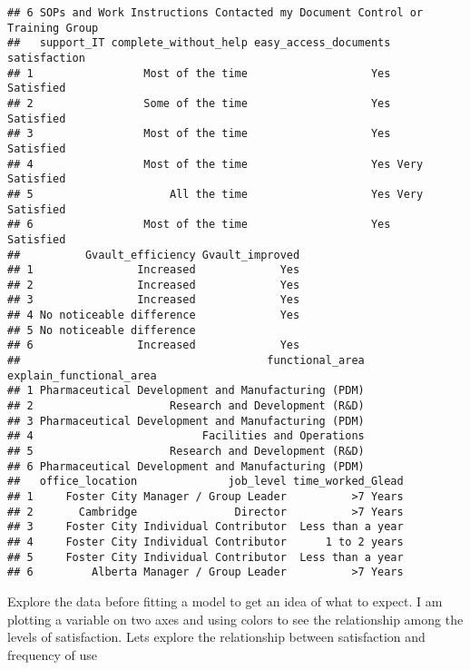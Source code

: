 \documentclass[
]{article}
\begin{document}
\begin{verbatim}
## 6 SOPs and Work Instructions Contacted my Document Control or Training Group
##   support_IT complete_without_help easy_access_documents   satisfaction
## 1                 Most of the time                   Yes      Satisfied
## 2                 Some of the time                   Yes      Satisfied
## 3                 Most of the time                   Yes      Satisfied
## 4                 Most of the time                   Yes Very Satisfied
## 5                     All the time                   Yes Very Satisfied
## 6                 Most of the time                   Yes      Satisfied
##          Gvault_efficiency Gvault_improved
## 1                Increased             Yes
## 2                Increased             Yes
## 3                Increased             Yes
## 4 No noticeable difference             Yes
## 5 No noticeable difference                
## 6                Increased             Yes
##                                      functional_area explain_functional_area
## 1 Pharmaceutical Development and Manufacturing (PDM)                        
## 2                     Research and Development (R&D)                        
## 3 Pharmaceutical Development and Manufacturing (PDM)                        
## 4                          Facilities and Operations                        
## 5                     Research and Development (R&D)                        
## 6 Pharmaceutical Development and Manufacturing (PDM)                        
##   office_location              job_level time_worked_Glead
## 1     Foster City Manager / Group Leader          >7 Years
## 2       Cambridge               Director          >7 Years
## 3     Foster City Individual Contributor  Less than a year
## 4     Foster City Individual Contributor      1 to 2 years
## 5     Foster City Individual Contributor  Less than a year
## 6         Alberta Manager / Group Leader          >7 Years
\end{verbatim}

Explore the data before fitting a model to get an idea of what to
expect. I am plotting a variable on two axes and using colors to see the
relationship among the levels of satisfaction. Lets explore the
relationship between satisfaction and frequency of use
\end{document}
